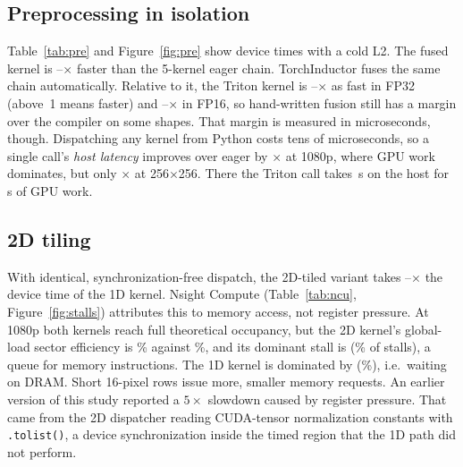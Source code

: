 \documentclass[10pt,twocolumn,letterpaper]{article}
\begin{document}
\subsection{Preprocessing in isolation}
Table~\ref{tab:pre} and Figure~\ref{fig:pre} show device times with a cold L2. The fused kernel is
--$\times$ faster than the 5-kernel eager
chain. TorchInductor fuses the same chain automatically. Relative to it, the Triton kernel is
--$\times$ as fast in FP32 (above~1
means faster) and --$\times$
in FP16, so hand-written fusion still has a margin over the compiler on some shapes. That margin is
measured in microseconds, though. Dispatching any kernel from Python costs tens of microseconds, so
a single call's \emph{host latency} improves over eager by $\times$
at 1080p, where GPU work dominates, but only $\times$ at
256$\times$256. There the Triton call takes \,\textmu s on the host for
\,\textmu s of GPU work.

\subsection{2D tiling}
With identical, synchronization-free dispatch, the 2D-tiled variant takes
--$\times$ the device time of the 1D kernel.
Nsight Compute (Table~\ref{tab:ncu}, Figure~\ref{fig:stalls}) attributes this to memory access, not
register pressure. At 1080p
both kernels reach full theoretical occupancy, but the 2D kernel's global-load sector efficiency is
\% against \%,
and its dominant stall is 
(\% of stalls), a queue for memory instructions.
The 1D kernel is dominated by 
(\%), i.e.\ waiting on DRAM. Short 16-pixel rows
issue more, smaller memory requests. An earlier version of this study reported a $5\times$ slowdown
caused by register pressure. That came from the 2D dispatcher reading CUDA-tensor normalization
constants with \texttt{.tolist()}, a device synchronization inside the timed region that the 1D path
did not perform.
\end{document}
